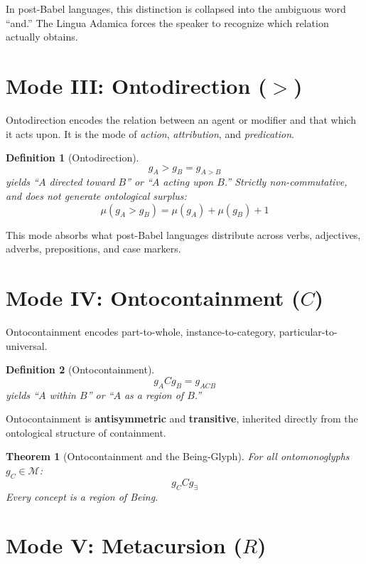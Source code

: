 \documentclass[12pt, letterpaper]{book}
\def\equiv{=}%
\def\triangleright{>}%
\def\subset{C}%
\def\circlearrowleft{R}%
\def\mathfrak#1{#1}%
\newtheorem{theorem}{Theorem}[chapter]
\newtheorem{definition}{Definition}[chapter]
\newcommand{\E}{\exists}                          %
\begin{document}
In post-Babel languages, this distinction is collapsed into the ambiguous word ``and.'' The Lingua Adamica forces the speaker to recognize which relation actually obtains.


\section{Mode III: Ontodirection ($\triangleright$)}

Ontodirection encodes the relation between an agent or modifier and that which it acts upon. It is the mode of \textit{action}, \textit{attribution}, and \textit{predication}.

\begin{definition}[Ontodirection]
\[
\mathfrak{g}_A \triangleright \mathfrak{g}_B \equiv \mathfrak{g}_{A \triangleright B}
\]
yields ``$A$ directed toward $B$'' or ``$A$ acting upon $B$.'' Strictly non-commutative, and does \textit{not} generate ontological surplus:
\[
\mu(\mathfrak{g}_A \triangleright \mathfrak{g}_B) \equiv \mu(\mathfrak{g}_A) + \mu(\mathfrak{g}_B) + 1
\]
\end{definition}

This mode absorbs what post-Babel languages distribute across verbs, adjectives, adverbs, prepositions, and case markers.

\section{Mode IV: Ontocontainment ($\subset$)}

Ontocontainment encodes part-to-whole, instance-to-category, particular-to-universal.

\begin{definition}[Ontocontainment]
\[
\mathfrak{g}_A \subset \mathfrak{g}_B \equiv \mathfrak{g}_{A \subset B}
\]
yields ``$A$ within $B$'' or ``$A$ as a region of $B$.''
\end{definition}

Ontocontainment is \textbf{antisymmetric} and \textbf{transitive}, inherited directly from the ontological structure of containment.

\begin{theorem}[Ontocontainment and the Being-Glyph]
For all ontomonoglyphs $\mathfrak{g}_C \in \mathcal{M}$:
\[
\mathfrak{g}_C \subset \mathfrak{g}_\E
\]
Every concept is a region of Being.
\end{theorem}

\section{Mode V: Metacursion ($\circlearrowleft$)}
\end{document}
